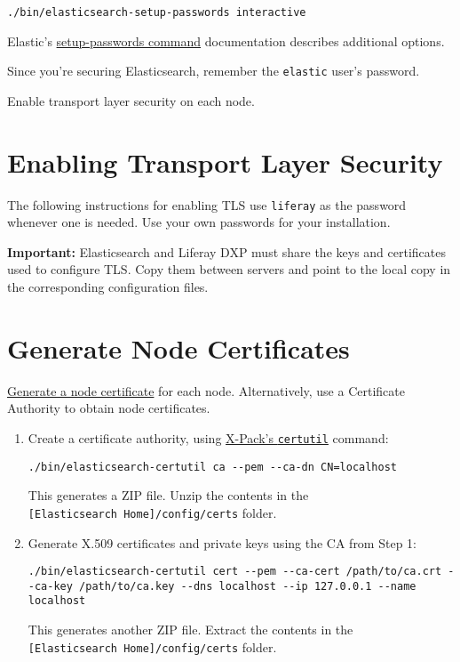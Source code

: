 \begin{verbatim}
./bin/elasticsearch-setup-passwords interactive
\end{verbatim}

Elastic's
\href{https://www.elastic.co/guide/en/elasticsearch/reference/7.x/setup-passwords.html}{setup-passwords
command} documentation describes additional options.

Since you're securing Elasticsearch, remember the \texttt{elastic}
user's password.

Enable transport layer security on each node.

\section{Enabling Transport Layer
Security}\label{enabling-transport-layer-security}

The following instructions for enabling TLS use \texttt{liferay} as the
password whenever one is needed. Use your own passwords for your
installation.

\noindent\hrulefill

\textbf{Important:} Elasticsearch and Liferay DXP must share the keys
and certificates used to configure TLS. Copy them between servers and
point to the local copy in the corresponding configuration files.

\noindent\hrulefill

\section{Generate Node Certificates}\label{generate-node-certificates}

\href{https://www.elastic.co/guide/en/elasticsearch/reference/7.x/configuring-tls.html\#node-certificates}{Generate
a node certificate} for each node. Alternatively, use a Certificate
Authority to obtain node certificates.

\begin{enumerate}
\def\labelenumi{\arabic{enumi}.}
\item
  Create a certificate authority, using
  \href{https://www.elastic.co/guide/en/elasticsearch/reference/7.x/certutil.html}{X-Pack's
  \texttt{certutil}} command:

\begin{verbatim}
./bin/elasticsearch-certutil ca --pem --ca-dn CN=localhost
\end{verbatim}

  This generates a ZIP file. Unzip the contents in the
  \texttt{{[}Elasticsearch\ Home{]}/config/certs} folder.
\item
  Generate X.509 certificates and private keys using the CA from Step 1:

\begin{verbatim}
./bin/elasticsearch-certutil cert --pem --ca-cert /path/to/ca.crt --ca-key /path/to/ca.key --dns localhost --ip 127.0.0.1 --name localhost
\end{verbatim}

  This generates another ZIP file. Extract the contents in the
  \texttt{{[}Elasticsearch\ Home{]}/config/certs} folder.
\end{enumerate}

